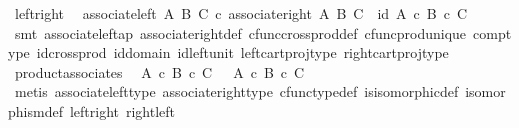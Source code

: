 \begin{isabellebody}
\ left{\isacharunderscore}{\kern0pt}right{\isacharcolon}{\kern0pt}\ \isanewline
\ {\isachardoublequoteopen}associate{\isacharunderscore}{\kern0pt}left\ A\ B\ C\ {\isasymcirc}\isactrlsub c\ associate{\isacharunderscore}{\kern0pt}right\ A\ B\ C\ {\isacharequal}{\kern0pt}\ id\ {\isacharparenleft}{\kern0pt}{\isacharparenleft}{\kern0pt}A\ {\isasymtimes}\isactrlsub c\ B{\isacharparenright}{\kern0pt}\ {\isasymtimes}\isactrlsub c\ C{\isacharparenright}{\kern0pt}{\isachardoublequoteclose}\isanewline
%
\isadelimproof
\ \ \ \ %
\endisadelimproof
%
\isatagproof
{}\isamarkupfalse%
\ {\isacharparenleft}{\kern0pt}smt\ associate{\isacharunderscore}{\kern0pt}left{\isacharunderscore}{\kern0pt}ap\ associate{\isacharunderscore}{\kern0pt}right{\isacharunderscore}{\kern0pt}def\ cfunc{\isacharunderscore}{\kern0pt}cross{\isacharunderscore}{\kern0pt}prod{\isacharunderscore}{\kern0pt}def\ cfunc{\isacharunderscore}{\kern0pt}prod{\isacharunderscore}{\kern0pt}unique\ comp{\isacharunderscore}{\kern0pt}type\ id{\isacharunderscore}{\kern0pt}cross{\isacharunderscore}{\kern0pt}prod\ id{\isacharunderscore}{\kern0pt}domain\ id{\isacharunderscore}{\kern0pt}left{\isacharunderscore}{\kern0pt}unit{}\ left{\isacharunderscore}{\kern0pt}cart{\isacharunderscore}{\kern0pt}proj{\isacharunderscore}{\kern0pt}type\ right{\isacharunderscore}{\kern0pt}cart{\isacharunderscore}{\kern0pt}proj{\isacharunderscore}{\kern0pt}type{\isacharparenright}{\kern0pt}%
\endisatagproof
{\isafoldproof}%
%
\isadelimproof
\isanewline
%
\endisadelimproof
\isanewline
{}\isamarkupfalse%
\ product{\isacharunderscore}{\kern0pt}associates{\isacharcolon}{\kern0pt}\isanewline
\ \ {\isachardoublequoteopen}A\ {\isasymtimes}\isactrlsub c\ {\isacharparenleft}{\kern0pt}B\ {\isasymtimes}\isactrlsub c\ C{\isacharparenright}{\kern0pt}\ \ {\isasymcong}\ {\isacharparenleft}{\kern0pt}A\ {\isasymtimes}\isactrlsub c\ B{\isacharparenright}{\kern0pt}\ {\isasymtimes}\isactrlsub c\ C{\isachardoublequoteclose}\isanewline
%
\isadelimproof
\ \ \ \ %
\endisadelimproof
%
\isatagproof
{}\isamarkupfalse%
\ {\isacharparenleft}{\kern0pt}metis\ associate{\isacharunderscore}{\kern0pt}left{\isacharunderscore}{\kern0pt}type\ associate{\isacharunderscore}{\kern0pt}right{\isacharunderscore}{\kern0pt}type\ cfunc{\isacharunderscore}{\kern0pt}type{\isacharunderscore}{\kern0pt}def\ is{\isacharunderscore}{\kern0pt}isomorphic{\isacharunderscore}{\kern0pt}def\ isomorphism{\isacharunderscore}{\kern0pt}def\ left{\isacharunderscore}{\kern0pt}right\ right{\isacharunderscore}{\kern0pt}left{\isacharparenright}{\kern0pt}%
\endisatagproof

\end{isabellebody}
